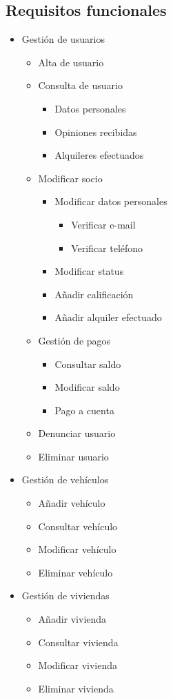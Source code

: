 \documentclass[11pt,spanish]{article} %
\begin{document}
\subsection{Requisitos funcionales}
\begin{itemize}
	\item Gestión de usuarios
	
	\begin{itemize}
		\item Alta de usuario
		\item Consulta de usuario
		\begin{itemize}
			\item Datos personales
			\item Opiniones recibidas
			\item Alquileres efectuados
		\end{itemize}
		\item Modificar socio
		\begin{itemize}
			\item Modificar datos personales
			\begin{itemize}
				\item Verificar e-mail
				\item Verificar teléfono
			\end{itemize}
			\item Modificar status
			\item Añadir calificación
			\item Añadir alquiler efectuado
		\end{itemize}
		\item Gestión de pagos
		\begin{itemize}
			\item Consultar saldo
			\item Modificar saldo
			\item Pago a cuenta
		\end{itemize}
		\item Denunciar usuario
		\item Eliminar usuario
	\end{itemize}
	
	\item Gestión de vehículos
	\begin{itemize}
		\item Añadir vehículo
		\item Consultar vehículo
		\item Modificar vehículo
		\item Eliminar vehículo
	\end{itemize}
	\item Gestión de viviendas
	\begin{itemize}
		\item Añadir vivienda
		\item Consultar vivienda
		\item Modificar vivienda
		\item Eliminar vivienda
	\end{itemize}
	

\end{itemize}
\end{document}
